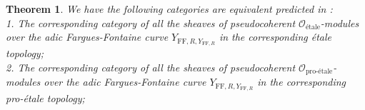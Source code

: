 \documentclass[12pt]{amsart}
\newtheorem{theorem}{Theorem}[section]
\theoremstyle{definition}
\numberwithin{equation}{section}
\begin{document}
\begin{theorem}
We have the following categories are equivalent predicted in \cite{CKZ}:	\\
1. The corresponding category of all the sheaves of pseudocoherent $\mathcal{O}_{\text{\'etale}}$-modules over the adic Fargues-Fontaine curve $Y_{\mathrm{FF},R,Y_{\mathrm{FF},R}}$ in the corresponding \'etale topology;\\
2. The corresponding category of all the sheaves of pseudocoherent $\mathcal{O}_{\text{pro-\'etale}}$-modules over the adic Fargues-Fontaine curve $Y_{\mathrm{FF},R,Y_{\mathrm{FF},R}}$ in the corresponding pro-\'etale topology;\\

\end{theorem}
\end{document}
